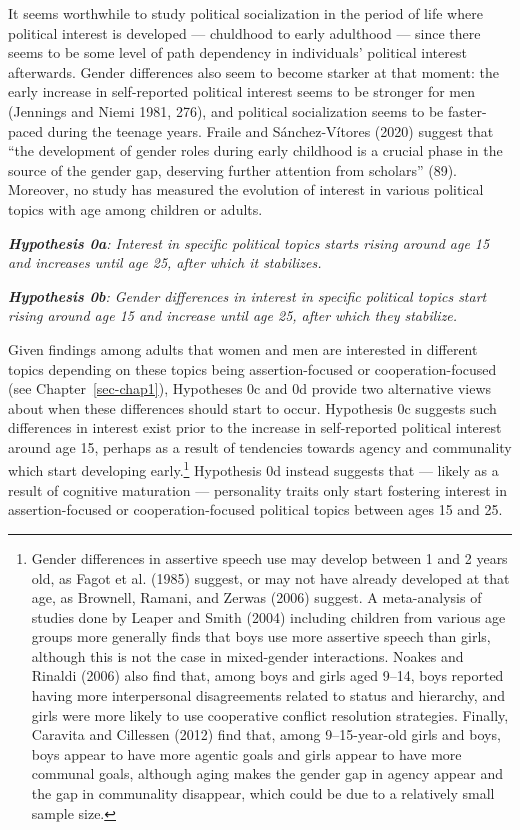 \documentclass[
  letterpaper,
  DIV=11,
  numbers=noendperiod]{scrreprt}
\begin{document}
It seems worthwhile to study political socialization in the period of
life where political interest is developed --- chuldhood to early
adulthood --- since there seems to be some level of path dependency in
individuals' political interest afterwards. Gender differences also seem
to become starker at that moment: the early increase in self-reported
political interest seems to be stronger for men (Jennings and Niemi
1981, 276), and political socialization seems to be faster-paced during
the teenage years. Fraile and Sánchez-Vítores (2020) suggest that ``the
development of gender roles during early childhood is a crucial phase in
the source of the gender gap, deserving further attention from
scholars'' (89). Moreover, no study has measured the evolution of
interest in various political topics with age among children or adults.

\emph{\textbf{Hypothesis 0a}: Interest in specific political topics
starts rising around age 15 and increases until age 25, after which it
stabilizes.}

\emph{\textbf{Hypothesis 0b}: Gender differences in interest in specific
political topics start rising around age 15 and increase until age 25,
after which they stabilize.}

Given findings among adults that women and men are interested in
different topics depending on these topics being assertion-focused or
cooperation-focused (see Chapter~\ref{sec-chap1}), Hypotheses 0c and 0d
provide two alternative views about when these differences should start
to occur. Hypothesis 0c suggests such differences in interest exist
prior to the increase in self-reported political interest around age 15,
perhaps as a result of tendencies towards agency and communality which
start developing early.\footnote{Gender differences in assertive speech
  use may develop between 1 and 2 years old, as Fagot et al. (1985)
  suggest, or may not have already developed at that age, as Brownell,
  Ramani, and Zerwas (2006) suggest. A meta-analysis of studies done by
  Leaper and Smith (2004) including children from various age groups
  more generally finds that boys use more assertive speech than girls,
  although this is not the case in mixed-gender interactions. Noakes and
  Rinaldi (2006) also find that, among boys and girls aged 9--14, boys
  reported having more interpersonal disagreements related to status and
  hierarchy, and girls were more likely to use cooperative conflict
  resolution strategies. Finally, Caravita and Cillessen (2012) find
  that, among 9--15-year-old girls and boys, boys appear to have more
  agentic goals and girls appear to have more communal goals, although
  aging makes the gender gap in agency appear and the gap in communality
  disappear, which could be due to a relatively small sample size.}
Hypothesis 0d instead suggests that --- likely as a result of cognitive
maturation --- personality traits only start fostering interest in
assertion-focused or cooperation-focused political topics between ages
15 and 25.
\end{document}
